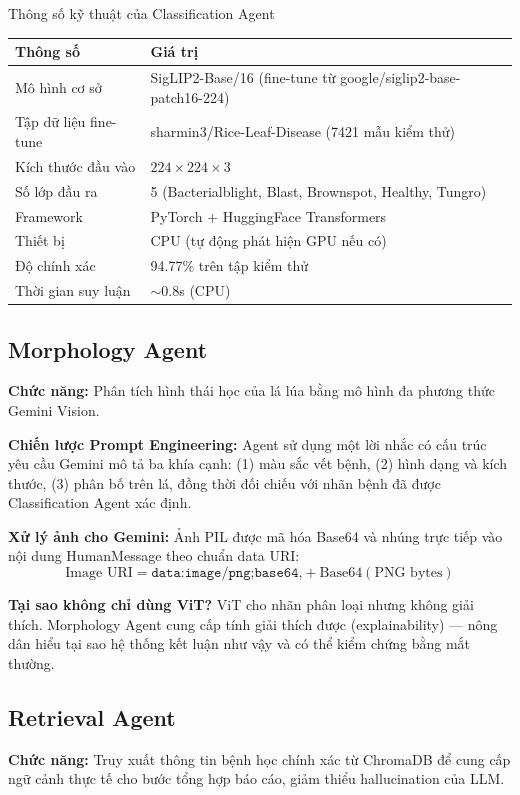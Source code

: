 \begin{table}[H]{Thông số kỹ thuật của Classification Agent}
\centering
\begin{tabular}{lp{9cm}}
\toprule
\textbf{Thông số} & \textbf{Giá trị} \\
\midrule
Mô hình cơ sở & SigLIP2-Base/16 (fine-tune từ google/siglip2-base-patch16-224) \\
Tập dữ liệu fine-tune & sharmin3/Rice-Leaf-Disease (7421 mẫu kiểm thử) \\
Kích thước đầu vào & $224 \times 224 \times 3$ \\
Số lớp đầu ra & 5 (Bacterialblight, Blast, Brownspot, Healthy, Tungro) \\
Framework & PyTorch + HuggingFace Transformers \\
Thiết bị & CPU (tự động phát hiện GPU nếu có) \\
Độ chính xác & 94.77\% trên tập kiểm thử \\
Thời gian suy luận & $\sim$0.8s (CPU) \\
\bottomrule
\end{tabular}
\end{table}

\subsection{Morphology Agent}
\textbf{Chức năng:} Phân tích hình thái học của lá lúa bằng mô hình đa phương thức Gemini Vision.

\textbf{Chiến lược Prompt Engineering:} Agent sử dụng một lời nhắc có cấu trúc yêu cầu Gemini mô tả ba khía cạnh: (1) màu sắc vết bệnh, (2) hình dạng và kích thước, (3) phân bố trên lá, đồng thời đối chiếu với nhãn bệnh đã được Classification Agent xác định.

\textbf{Xử lý ảnh cho Gemini:} Ảnh PIL được mã hóa Base64 và nhúng trực tiếp vào nội dung HumanMessage theo chuẩn data URI:
\begin{equation}
    \text{Image URI} = \texttt{data:image/png;base64,} + \text{Base64}(\text{PNG bytes})
\end{equation}

\textbf{Tại sao không chỉ dùng ViT?} ViT cho nhãn phân loại nhưng không giải thích. Morphology Agent cung cấp tính giải thích được (explainability) --- nông dân hiểu tại sao hệ thống kết luận như vậy và có thể kiểm chứng bằng mắt thường.

\subsection{Retrieval Agent}
\textbf{Chức năng:} Truy xuất thông tin bệnh học chính xác từ ChromaDB để cung cấp ngữ cảnh thực tế cho bước tổng hợp báo cáo, giảm thiểu hallucination của LLM.

